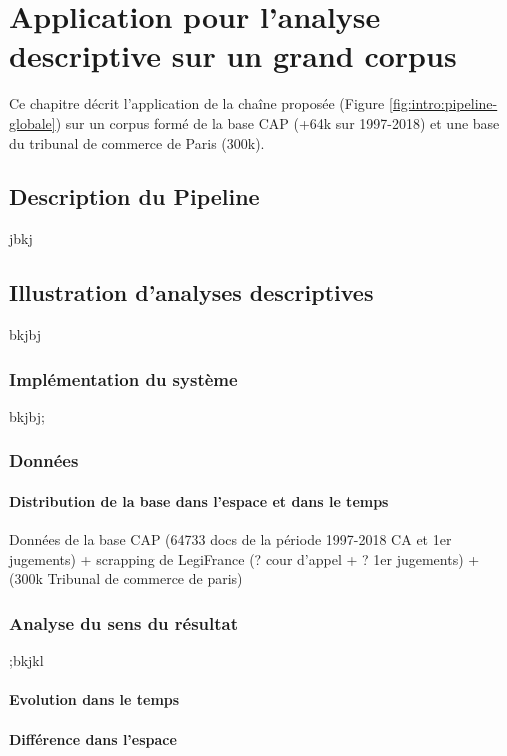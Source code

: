 \chapter{Application pour l'analyse descriptive sur un grand corpus}
\label{chap:demo}
Ce chapitre décrit l'application de la chaîne proposée (Figure \ref{fig:intro:pipeline-globale}) sur un corpus formé de la base CAP (+64k sur 1997-2018) et une base du tribunal de commerce de Paris (300k). 
 
 
\section{Description du Pipeline}
\label{sec:demo:motivation}

jbkj

\section{Illustration d'analyses descriptives}
\label{sec:demo:experimentations}

bkjbj


\subsection{Implémentation du système}

bkjbj;


\subsection{Données}
\subsubsection{Distribution de la base dans l'espace et dans le temps}

Données de la base CAP (64733 docs de la période 1997-2018 CA et 1er jugements) + scrapping de LegiFrance (? cour d'appel + ? 1er jugements) +  (300k Tribunal de commerce de paris)


\subsection{Analyse du sens du résultat}
;bkjkl
\subsubsection{Evolution dans le temps}
\subsubsection{Différence dans l'espace}

